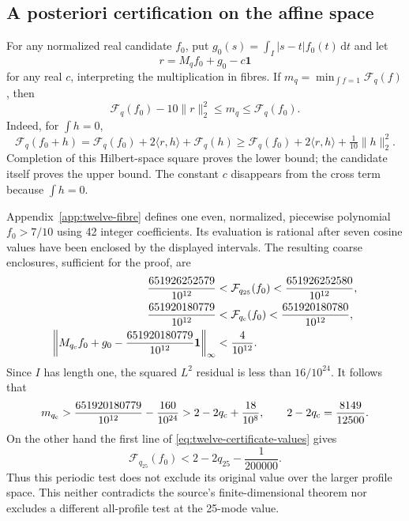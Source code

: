 \documentclass[11pt,reqno]{amsart}
\numberwithin{equation}{section}
\newcommand{\dd}{\,\mathrm d}
\newcommand{\one}{\mathbf1}
\begin{document}
\subsection{A posteriori certification on the affine space}

For any normalized real candidate $f_0$, put
$g_0(s)=\int_I|s-t|f_0(t)\dd t$ and let
\[
 r=M_qf_0+g_0-c\one
\]
for any real $c$, interpreting the multiplication in fibres.
If $m_q=\min_{\int f=1}\mathcal F_q(f)$, then
\begin{equation}
 \mathcal F_q(f_0)-10\|r\|_2^2
 \le m_q\le\mathcal F_q(f_0).
 \label{eq:twelve-residual-certificate}
\end{equation}
Indeed, for $\int h=0$,
\[
 \mathcal F_q(f_0+h)
 =\mathcal F_q(f_0)+2\langle r,h\rangle+\mathcal F_q(h)
 \ge\mathcal F_q(f_0)+2\langle r,h\rangle+\tfrac1{10}\|h\|_2^2.
\]
Completion of this Hilbert-space square proves the lower bound;
the candidate itself proves the upper bound. The constant $c$
disappears from the cross term because $\int h=0$.

Appendix~\ref{app:twelve-fibre} defines one even, normalized,
piecewise polynomial $f_0>7/10$ using 42 integer coefficients.
Its evaluation is rational after seven cosine values have been
enclosed by the displayed intervals. The resulting coarse
enclosures, sufficient for the proof, are
\begin{equation}
 \begin{split}
 \frac{651926252579}{10^{12}}
 &<\mathcal F_{q_{25}}(f_0)
   <\frac{651926252580}{10^{12}},\\
 \frac{651920180779}{10^{12}}
 &<\mathcal F_{q_{\rm c}}(f_0)
   <\frac{651920180780}{10^{12}},\\
 \left\|M_{q_{\rm c}}f_0+g_0-
       \frac{651920180779}{10^{12}}\one\right\|_\infty
 &<\frac4{10^{12}}.
 \end{split}
 \label{eq:twelve-certificate-values}
\end{equation}
Since $I$ has length one, the squared $L^2$ residual is less
than $16/10^{24}$. It follows that
\begin{equation}
 m_{q_{\rm c}}>
 \frac{651920180779}{10^{12}}-\frac{160}{10^{24}}
 >2-2q_{\rm c}+\frac{18}{10^8},
 \qquad 2-2q_{\rm c}=\frac{8149}{12500}.
 \label{eq:twelve-positive-margin}
\end{equation}
On the other hand the first line of
\eqref{eq:twelve-certificate-values} gives
\begin{equation}
 \mathcal F_{q_{25}}(f_0)
 <2-2q_{25}-\frac1{200000}.
 \label{eq:old-periodic-test-fails}
\end{equation}
Thus this periodic test does not exclude its original value over
the larger profile space. This neither contradicts the source's
finite-dimensional theorem nor excludes a different all-profile
test at the 25-mode value.
\end{document}

